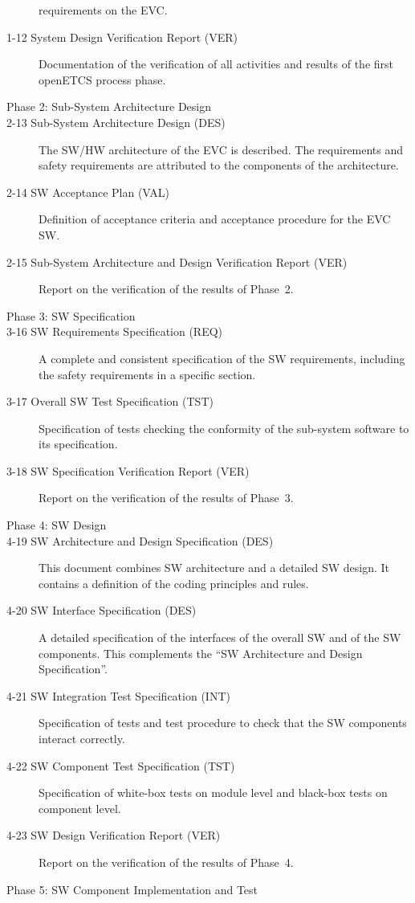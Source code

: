 \documentclass{template/openetcs_article}
\begin{document}
\begin{description}
  requirements on the EVC.
\item[1-12 System Design Verification Report (VER)] Documentation of the verification
  of all activities and results of the first openETCS process phase.
\item[Phase 2: Sub-System Architecture Design] 
\item[2-13 Sub-System Architecture Design (DES)] The SW/HW
  architecture of the EVC is described. The requirements and safety requirements are
  attributed to the components of the architecture.
\item[2-14 SW Acceptance Plan (VAL)] Definition of acceptance criteria and
  acceptance procedure for the EVC SW.  
\item[2-15 Sub-System Architecture and Design Verification Report (VER)]
  Report on the verification of the results of Phase~2.
\item[Phase 3: SW Specification] 
\item[3-16 SW Requirements Specification (REQ)]  A complete and consistent
  specification of the SW requirements, including the safety
  requirements in a specific section. 
\item[3-17 Overall SW Test Specification (TST)] Specification of tests
  checking the conformity of the sub-system software to its specification. 
\item[3-18 SW Specification Verification Report (VER)] Report on the
  verification of the results of Phase~3.
\item[Phase 4: SW Design] 
\item[4-19 SW Architecture and Design Specification (DES)]  This
  document combines SW architecture and a detailed SW design. It contains a
  definition of the coding principles and rules.
\item[4-20 SW Interface Specification (DES)] A detailed specification
  of the interfaces of the overall SW and of the SW components. This
  complements the ``SW Architecture and Design Specification''.
\item[4-21 SW Integration Test Specification (INT)] Specification of
  tests and test procedure to check that the SW components interact
  correctly.
\item[4-22 SW Component Test Specification (TST)] Specification of
  white-box tests on module level and black-box tests on component level.
\item[4-23 SW Design Verification Report (VER)] Report on the
  verification of the results of Phase~4.
\item[Phase 5: SW Component Implementation and Test] 

\end{description}
\end{document}
